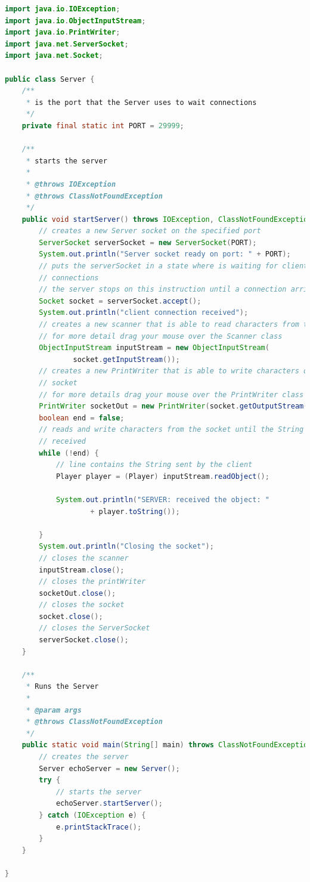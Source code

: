 \documentclass{article}
\begin{document}
\begin{lstlisting}[language=Java,escapechar=|]
import java.io.IOException;
import java.io.ObjectInputStream;
import java.io.PrintWriter;
import java.net.ServerSocket;
import java.net.Socket;

public class Server {
	/**
	 * is the port that the Server uses to wait connections
	 */
	private final static int PORT = 29999;

	/**
	 * starts the server
	 * 
	 * @throws IOException
	 * @throws ClassNotFoundException 
	 */
	public void startServer() throws IOException, ClassNotFoundException {
		// creates a new Server socket on the specified port
		ServerSocket serverSocket = new ServerSocket(PORT);
		System.out.println("Server socket ready on port: " + PORT);
		// puts the serverSocket in a state where is waiting for client
		// connections
		// the server stops on this instruction until a connection arrives
		Socket socket = serverSocket.accept();
		System.out.println("client connection received");
		// creates a new scanner that is able to read characters from the socket
		// for more detail drag your mouse over the Scanner class
		ObjectInputStream inputStream = new ObjectInputStream(
				socket.getInputStream());
		// creates a new PrintWriter that is able to write characters on the
		// socket
		// for more details drag your mouse over the PrintWriter class
		PrintWriter socketOut = new PrintWriter(socket.getOutputStream());
		boolean end = false;
		// reads and write characters from the socket until the String quit is
		// received
		while (!end) {
			// line contains the String sent by the client
			Player player = (Player) inputStream.readObject();

			System.out.println("SERVER: received the object: "
					+ player.toString());

		}
		System.out.println("Closing the socket");
		// closes the scanner
		inputStream.close();
		// closes the printWriter
		socketOut.close();
		// closes the socket
		socket.close();
		// closes the ServerSocket
		serverSocket.close();
	}

	/**
	 * Runs the Server
	 * 
	 * @param args
	 * @throws ClassNotFoundException 
	 */
	public static void main(String[] main) throws ClassNotFoundException {
		// creates the server
		Server echoServer = new Server();
		try {
			// starts the server
			echoServer.startServer();
		} catch (IOException e) {
			e.printStackTrace();
		}
	}

}
\end{lstlisting}
\end{document}
